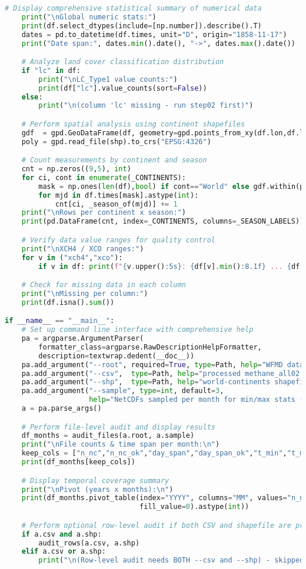 \begin{lstlisting}[language=Python, caption=Dataset Health Check Algorithm, label=alg:step05_health_check]
    # Display comprehensive statistical summary of numerical data
    print("\nGlobal numeric stats:")
    print(df.select_dtypes(include=[np.number]).describe().T)
    dates = pd.to_datetime(df.times, unit="D", origin="1858-11-17")
    print("Date span:", dates.min().date(), "->", dates.max().date())

    # Analyze land cover classification distribution
    if "lc" in df:
        print("\nLC_Type1 value counts:")
        print(df["lc"].value_counts(sort=False))
    else:
        print("\n(column 'lc' missing - run step02 first)")

    # Perform spatial analysis using continent shapefiles
    gdf  = gpd.GeoDataFrame(df, geometry=gpd.points_from_xy(df.lon,df.lat), crs="EPSG:4326")
    poly = gpd.read_file(shp).to_crs("EPSG:4326")

    # Count measurements by continent and season
    cnt = np.zeros((9,5), int)
    for ci, cont in enumerate(_CONTINENTS):
        mask = np.ones(len(df),bool) if cont=="World" else gdf.within(poly.geometry[ci]).values
        for mjd in df.times[mask].astype(int):
            cnt[ci, _season_of(mjd)] += 1
    print("\nRows per continent x season:")
    print(pd.DataFrame(cnt, index=_CONTINENTS, columns=_SEASON_LABELS))

    # Verify data value ranges for quality control
    print("\nXCH4 / XCO ranges:")
    for v in ("xch4","xco"):
        if v in df: print(f"{v.upper():5s}: {df[v].min():8.1f} ... {df[v].max():8.1f}")

    # Check for missing data in each column
    print("\nMissing per column:")
    print(df.isna().sum())

if __name__ == "__main__":
    # Set up command line interface with comprehensive help
    pa = argparse.ArgumentParser(
        formatter_class=argparse.RawDescriptionHelpFormatter,
        description=textwrap.dedent(__doc__))
    pa.add_argument("--root", required=True, type=Path, help="WFMD dataset root dir")
    pa.add_argument("--csv",  type=Path, help="processed methane_all02.txt")
    pa.add_argument("--shp",  type=Path, help="world-continents shapefile")
    pa.add_argument("--sample", type=int, default=3,
                    help="NetCDFs sampled per month for min/max stats (default 3)")
    a = pa.parse_args()

    # Perform file-level audit and display results
    df_months = audit_files(a.root, a.sample)
    print("\nFile counts & time span per month:\n")
    keep_cols = ["n_nc","n_nc_ok","day_span","day_span_ok","t_min","t_max","bad_ts"]
    print(df_months[keep_cols])

    # Display temporal coverage summary
    print("\nPivot (years x months):\n")
    print(df_months.pivot_table(index="YYYY", columns="MM", values="n_nc",
                                fill_value=0).astype(int))

    # Perform optional row-level audit if both CSV and shapefile are provided
    if a.csv and a.shp:
        audit_rows(a.csv, a.shp)
    elif a.csv or a.shp:
        print("\n(Row-level audit needs BOTH --csv and --shp) - skipped")
\end{lstlisting}

